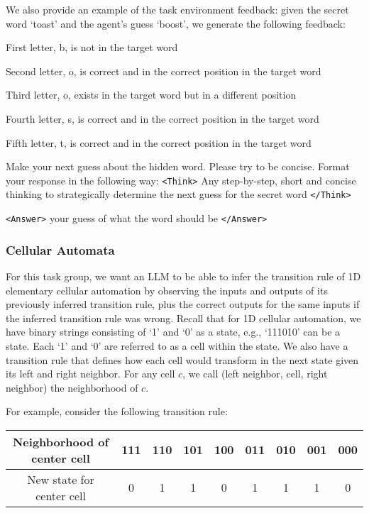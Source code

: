 We also provide an example of the task environment feedback: given the secret word `toast' and the agent's guess `boost', we generate the following feedback:

\begin{tcolorbox}[colback=gray!20, colframe=black, title=Wordle Task Environment Feedback]
First letter, b, is not in the target word 

Second letter, o, is correct and in the correct position in the target word 

Third letter, o, exists in the target word but in a different position 

Fourth letter, s, is correct and in the correct position in the target word 

Fifth letter, t, is correct and in the correct position in the target word

Make your next guess about the hidden word. Please try to be concise. Format your response in the following way: \texttt{<Think>} Any step-by-step, short and concise thinking to strategically determine the next guess for the secret word \texttt{</Think>} 

\texttt{<Answer>} your guess of what the word should be \texttt{</Answer>}

\end{tcolorbox}

\newpage

\subsubsection{Cellular Automata}

For this task group, we want an LLM to be able to infer the transition rule of 1D elementary cellular automation by observing the inputs and outputs of its previously inferred transition rule, plus the correct outputs for the same inputs if the inferred transition rule was wrong. Recall that for 1D cellular automation, we have binary strings consisting of `1' and `0' as a state, e.g., `111010' can be a state. Each `1' and `0' are referred to as a cell within the state. We also have a transition rule that defines how each cell would transform in the next state given its left and right neighbor. For any cell $c$, we call (left neighbor, cell, right neighbor) the neighborhood of $c$.

For example, consider the following transition rule:

\begin{table}[h]
\centering
\begin{tabular}{|c|c|c|c|c|c|c|c|c|}
\hline
Neighborhood of center cell & 111 & 110 & 101 & 100 & 011 & 010 & 001 & 000 \\
\hline
New state for center cell & 0 & 1 & 1 & 0 & 1 & 1 & 1 & 0 \\
\hline
\end{tabular}
\end{table}

